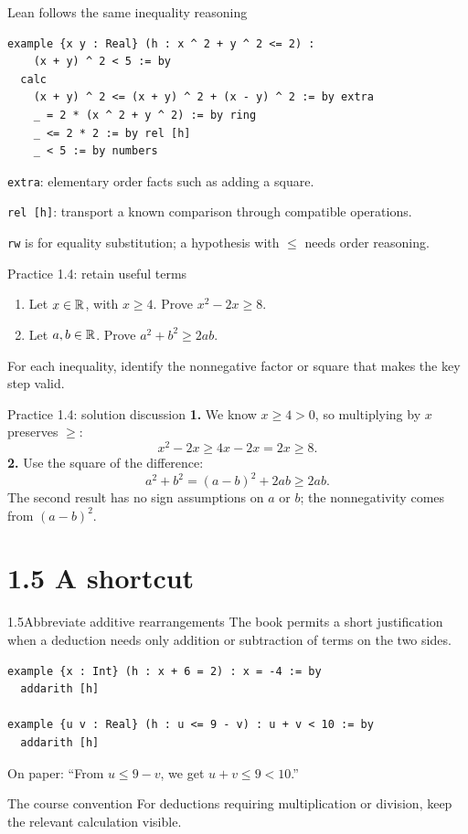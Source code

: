\begin{frame}[fragile]{Lean follows the same inequality reasoning}
\begin{lstlisting}
example {x y : Real} (h : x ^ 2 + y ^ 2 <= 2) :
    (x + y) ^ 2 < 5 := by
  calc
    (x + y) ^ 2 <= (x + y) ^ 2 + (x - y) ^ 2 := by extra
    _ = 2 * (x ^ 2 + y ^ 2) := by ring
    _ <= 2 * 2 := by rel [h]
    _ < 5 := by numbers
\end{lstlisting}
\texttt{extra}: elementary order facts such as adding a square.\par
\texttt{rel [h]}: transport a known comparison through compatible operations.\par
\texttt{rw} is for equality substitution; a hypothesis with $\le$ needs order reasoning.
\end{frame}

\begin{frame}{Practice 1.4: retain useful terms}
\begin{enumerate}
\item Let $x\in\mathbb{R}$, with $x\ge4$. Prove $x^2-2x\ge8$.
\item Let $a,b\in\mathbb{R}$. Prove $a^2+b^2\ge2ab$.
\end{enumerate}
\vspace{1em}
For each inequality, identify the nonnegative factor or square that makes the key step valid.
\end{frame}

\begin{frame}{Practice 1.4: solution discussion}
\textbf{1.} We know $x\ge4>0$, so multiplying by $x$ preserves $\ge$:
\[
x^2-2x\ge4x-2x=2x\ge8.
\]
\textbf{2.} Use the square of the difference:
\[
a^2+b^2=(a-b)^2+2ab\ge2ab.
\]
The second result has no sign assumptions on $a$ or $b$;
the nonnegativity comes from $(a-b)^2$.
\end{frame}

\section{1.5 A shortcut}
\begin{frame}[fragile]{1.5\quad Abbreviate additive rearrangements}
The book permits a short justification when a deduction needs only
addition or subtraction of terms on the two sides.
\begin{lstlisting}
example {x : Int} (h : x + 6 = 2) : x = -4 := by
  addarith [h]

example {u v : Real} (h : u <= 9 - v) : u + v < 10 := by
  addarith [h]
\end{lstlisting}
On paper: ``From $u\le9-v$, we get $u+v\le9<10$.''
\begin{block}{The course convention}
For deductions requiring multiplication or division, keep the relevant calculation visible.
\end{block}
\end{frame}

